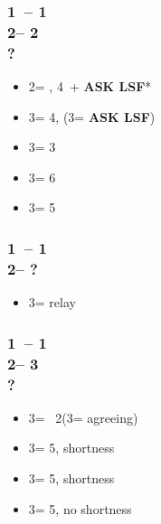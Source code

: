 \documentclass[12pt, a4paper]{report}
\renewcommand{\lsf}{{\color{BrickRed}\textbf{ASK LSF}}}
\begin{document}
\begin{bidpage}
\subsubsection*{1\clubs\ -- 1\major\\
                2\diams -- 2\spades\\
                ?}
\begin{itemize}
    \item 2\nt = \bal, 4\hearts\ + \lsf*
    \item 3\clubs = 4\hearts, \unbal (3\diams = \lsf)
    \item 3\diams = 3\hearts
    \item 3\hearts = 6\hearts
    \item 3\spades = 5\hearts
\end{itemize}
\end{bidpage}

\begin{bidpage}
\subsubsection*{1\clubs\ -- 1\hearts\\
                2\nt -- ?}
\begin{itemize}
    \item 3\clubs = relay
\end{itemize}
\end{bidpage}

\begin{bidpage}
\subsubsection*{1\clubs\ -- 1\hearts\\
                2\nt -- 3\clubs\\
                ?}
\begin{itemize}
    \item 3\diams = \bal\ 2\hearts (3\hearts = agreeing)
    \item 3\hearts = 5\diams, \hearts shortness
    \item 3\spades = 5\diams, \spades shortness
    \item 3\nt = 5\diams, no shortness
\end{itemize}
\end{bidpage}
\end{document}
